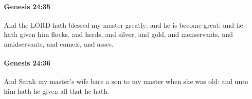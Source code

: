 		\paragraph{Genesis 24:35} %
			\label{GENESIS-24-35}

			And the LORD hath blessed my master greatly; and he is become great: and he hath given him flocks, and herds, and silver, and gold, and menservants, and maidservants, and camels, and asses.


		\paragraph{Genesis 24:36} %
			\label{GENESIS-24-36}

			And Sarah my master's wife bare a son to my master when she was old: and unto him hath he given all that he hath.


